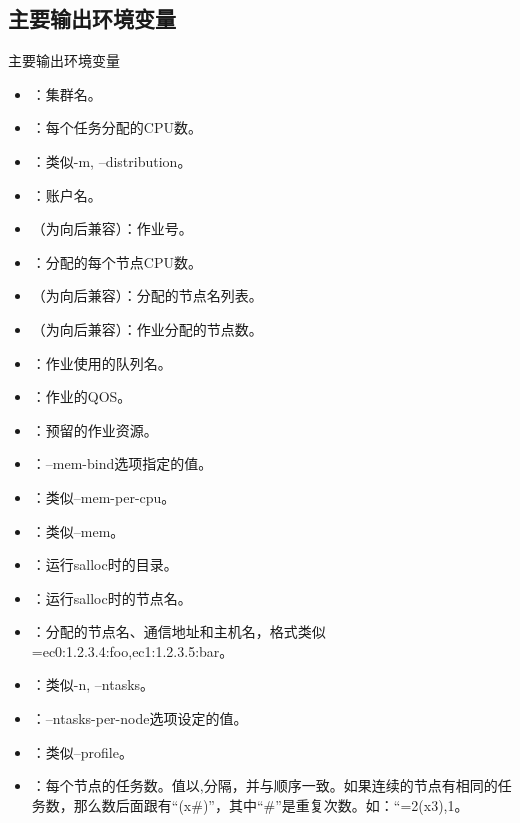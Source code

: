 \subsection{主要输出环境变量}
\begin{frame}{主要输出环境变量}
\begin{itemize}
	\item {}：集群名。
	\item {}：每个任务分配的CPU数。
	\item {}：类似-m, --distribution。
	\item {}：账户名。
	\item {}（为向后兼容）：作业号。
	\item {}：分配的每个节点CPU数。
	\item {}（为向后兼容）：分配的节点名列表。
	\item {}（为向后兼容）：作业分配的节点数。
	\item {}：作业使用的队列名。
	\item {}：作业的QOS。
	\item {}：预留的作业资源。
	\item {}：--mem-bind选项指定的值。
	\item {}：类似--mem-per-cpu。
	\item {}：类似--mem。
	\item {}：运行salloc时的目录。
	\item {}：运行salloc时的节点名。
	\item {}：分配的节点名、通信地址和主机名，格式类似\\=ec0:1.2.3.4:foo,ec1:1.2.3.5:bar。
	\item {}：类似-n, --ntasks。
	\item {}：--ntasks-per-node选项设定的值。
	\item {}：类似--profile。
	\item {}：每个节点的任务数。值以,分隔，并与顺序一致。如果连续的节点有相同的任务数，那么数后面跟有``(x\#)''，其中``\#''是重复次数。如：``=2(x3),1。
\end{itemize}
\end{frame}


